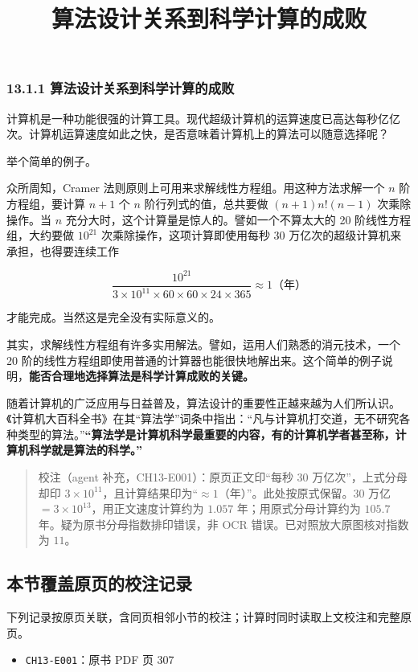 \documentclass[
  10pt,
  fontset=fandol]{ctexart}
\title{算法设计关系到科学计算的成败}
\author{}
\date{}
\providecommand{\tightlist}{%
  \setlength{\itemsep}{0pt}\setlength{\parskip}{0pt}}
\begin{document}
\maketitle

\subsubsection{13.1.1 算法设计关系到科学计算的成败}\label{ux7b97ux6cd5ux8bbeux8ba1ux5173ux7cfbux5230ux79d1ux5b66ux8ba1ux7b97ux7684ux6210ux8d25}

计算机是一种功能很强的计算工具。现代超级计算机的运算速度已高达每秒亿亿次。计算机运算速度如此之快，是否意味着计算机上的算法可以随意选择呢？

举个简单的例子。

众所周知，Cramer 法则原则上可用来求解线性方程组。用这种方法求解一个 \(n\) 阶方程组，要计算 \(n+1\) 个 \(n\) 阶行列式的值，总共要做 \((n+1)n!(n-1)\) 次乘除操作。当 \(n\) 充分大时，这个计算量是惊人的。譬如一个不算太大的 20 阶线性方程组，大约要做 \(10^{21}\) 次乘除操作，这项计算即使用每秒 30 万亿次的超级计算机来承担，也得要连续工作

\[
\frac{10^{21}}{3\times10^{11}\times60\times60\times24\times365}\approx1\text{（年）}
\]

才能完成。当然这是完全没有实际意义的。

其实，求解线性方程组有许多实用解法。譬如，运用人们熟悉的消元技术，一个 20 阶的线性方程组即使用普通的计算器也能很快地解出来。这个简单的例子说明，\textbf{能否合理地选择算法是科学计算成败的关键。}

随着计算机的广泛应用与日益普及，算法设计的重要性正越来越为人们所认识。《计算机大百科全书》在其``算法学''词条中指出：``凡与计算机打交道，无不研究各种类型的算法。''\textbf{``算法学是计算机科学最重要的内容，有的计算机学者甚至称，计算机科学就是算法的科学。''}

\begin{quote}
校注（agent 补充，CH13-E001）：原页正文印``每秒 30 万亿次''，上式分母却印 \(3\times10^{11}\)，且计算结果印为``\(\approx1\)（年）''。此处按原式保留。\(30\) 万亿 \(=3\times10^{13}\)，用正文速度计算约为 \(1.057\) 年；用原式分母计算约为 \(105.7\) 年。疑为原书分母指数排印错误，非 OCR 错误。已对照放大原图核对指数为 \(11\)。
\end{quote}

\subsection{本节覆盖原页的校注记录}\label{ux672cux8282ux8986ux76d6ux539fux9875ux7684ux6821ux6ce8ux8bb0ux5f55}

下列记录按原页关联，含同页相邻小节的校注；计算时同时读取上文校注和完整原页。

\begin{itemize}
\tightlist
\item
  \texttt{CH13-E001}：原书 PDF 页 307
\end{itemize}
\end{document}
